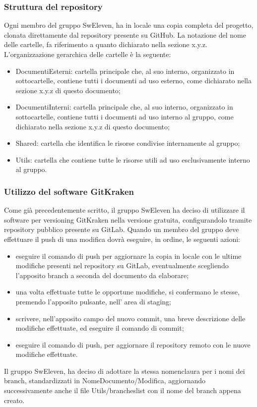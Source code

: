 \subsubsection{Struttura del repository}
Ogni membro del gruppo SwEleven, ha in locale una copia completa del progetto, clonata direttamente dal repository presente su GitHub. La notazione del nome delle cartelle, fa riferimento a quanto dichiarato nella sezione x.y.z. L’organizzazione gerarchica delle cartelle è la seguente:
\begin{itemize}
	\item DocumentiEsterni: cartella principale che, al suo interno, organizzato in sottocartelle, contiene tutti i documenti ad uso esterno, come dichiarato nella sezione x.y.z di questo documento;
	\item DocumentiInterni: cartella principale che, al suo interno, organizzato in sottocartelle, contiene tutti i documenti ad uso interno al gruppo, come dichiarato nella sezione x.y.z di questo documento;
	\item Shared: cartella che identifica le risorse condivise internamente al gruppo;
	\item Utils: cartella che contiene tutte le risorse utili ad uso esclusivamente interno al gruppo.
\end{itemize}

\subsubsection{Utilizzo del software GitKraken}
Come già precedentemente scritto, il gruppo SwEleven ha deciso di utilizzare il software per versioning GitKraken nella versione gratuita, configurandolo tramite repository pubblico presente su GitLab. Quando un membro del gruppo deve effettuare il push di una modifica dovrà eseguire, in ordine, le seguenti azioni:
\begin{itemize}
	\item eseguire il comando di push per aggiornare la copia in locale con le ultime modifiche presenti nel repository su GitLab, eventualmente scegliendo l’apposito branch a seconda del documento da elaborare;
	\item una volta effettuate tutte le opportune modifiche, si confermano le stesse, premendo l’apposito pulsante, nell’ area di staging;
	\item scrivere, nell’apposito campo del nuovo commit, una breve descrizione delle modifiche effettuate, ed eseguire il comando di commit;
	\item eseguire il comando di push, per aggiornare il repository remoto con le nuove modifiche effettuate.
\end{itemize}
Il gruppo SwEleven, ha deciso di adottare la stessa nomenclaura per i nomi dei branch, standardizzati in NomeDocumento/Modifica, aggiornando successivamente anche il file Utils/brancheslist con il nome del branch appena creato.

